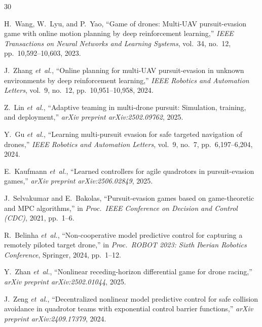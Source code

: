 \documentclass[lettersize,journal]{IEEEtran}
\theoremstyle{definition}
\theoremstyle{remark}
\begin{document}



\begin{thebibliography}{30}

H.~Wang, W.~Lyu, and P.~Yao,
``Game of drones: Multi-UAV pursuit-evasion game with online motion planning
  by deep reinforcement learning,''
\emph{IEEE Transactions on Neural Networks and Learning Systems},
vol.~34, no.~12, pp.~10,592--10,603, 2023.

J.~Zhang \emph{et~al.},
``Online planning for multi-UAV pursuit-evasion in unknown environments by
  deep reinforcement learning,''
\emph{IEEE Robotics and Automation Letters},
vol.~9, no.~12, pp.~10,951--10,958, 2024.

Z.~Lin \emph{et~al.},
``Adaptive teaming in multi-drone pursuit: Simulation, training, and
  deployment,''
\emph{arXiv preprint arXiv:2502.09762}, 2025.

Y.~Gu \emph{et~al.},
``Learning multi-pursuit evasion for safe targeted navigation of drones,''
\emph{IEEE Robotics and Automation Letters},
vol.~9, no.~7, pp.~6,197--6,204, 2024.

E.~Kaufmann \emph{et~al.},
``Learned controllers for agile quadrotors in pursuit-evasion games,''
\emph{arXiv preprint arXiv:2506.02849}, 2025.

J.~Selvakumar and E.~Bakolas,
``Pursuit-evasion games based on game-theoretic and MPC algorithms,''
in \emph{Proc.\ IEEE Conference on Decision and Control (CDC)},
2021, pp.~1--6.

R.~Belinha \emph{et~al.},
``Non-cooperative model predictive control for capturing a remotely piloted
  target drone,''
in \emph{Proc.\ ROBOT 2023: Sixth Iberian Robotics Conference},
Springer, 2024, pp.~1--12.

Y.~Zhan \emph{et~al.},
``Nonlinear receding-horizon differential game for drone racing,''
\emph{arXiv preprint arXiv:2502.01044}, 2025.

J.~Zeng \emph{et~al.},
``Decentralized nonlinear model predictive control for safe collision
  avoidance in quadrotor teams with exponential control barrier functions,''
\emph{arXiv preprint arXiv:2409.17379}, 2024.


\end{thebibliography}
\end{document}
